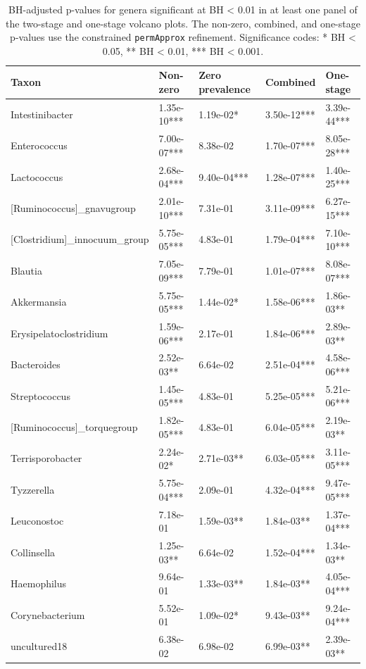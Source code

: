 \begin{table}[!h]
\centering
\caption{\label{tab:application:diff-distribution-pvalues-all-approaches}BH-adjusted p-values for genera significant at BH < 0.01 in at least one panel of the two-stage and one-stage volcano plots. The non-zero, combined, and one-stage p-values use the constrained \texttt{permApprox} refinement. Significance codes: * BH < 0.05, ** BH < 0.01, *** BH < 0.001.}
\centering
\fontsize{7}{9}\selectfont
\begin{tabular}[t]{lllll}
\toprule
Taxon & Non-zero & Zero prevalence & Combined & One-stage\\
\midrule
Intestinibacter & 1.35e-10*** & 1.19e-02* & 3.50e-12*** & 3.39e-44***\\
Enterococcus & 7.00e-07*** & 8.38e-02 & 1.70e-07*** & 8.05e-28***\\
Lactococcus & 2.68e-04*** & 9.40e-04*** & 1.28e-07*** & 1.40e-25***\\
{}[Ruminococcus]_gnavugroup & 2.01e-10*** & 7.31e-01 & 3.11e-09*** & 6.27e-15***\\
{}[Clostridium]_innocuum_group & 5.75e-05*** & 4.83e-01 & 1.79e-04*** & 7.10e-10***\\
\addlinespace
Blautia & 7.05e-09*** & 7.79e-01 & 1.01e-07*** & 8.08e-07***\\
Akkermansia & 5.75e-05*** & 1.44e-02* & 1.58e-06*** & 1.86e-03**\\
Erysipelatoclostridium & 1.59e-06*** & 2.17e-01 & 1.84e-06*** & 2.89e-03**\\
Bacteroides & 2.52e-03** & 6.64e-02 & 2.51e-04*** & 4.58e-06***\\
Streptococcus & 1.45e-05*** & 4.83e-01 & 5.25e-05*** & 5.21e-06***\\
\addlinespace
{}[Ruminococcus]_torquegroup & 1.82e-05*** & 4.83e-01 & 6.04e-05*** & 2.19e-03**\\
Terrisporobacter & 2.24e-02* & 2.71e-03** & 6.03e-05*** & 3.11e-05***\\
Tyzzerella & 5.75e-04*** & 2.09e-01 & 4.32e-04*** & 9.47e-05***\\
Leuconostoc & 7.18e-01 & 1.59e-03** & 1.84e-03** & 1.37e-04***\\
Collinsella & 1.25e-03** & 6.64e-02 & 1.52e-04*** & 1.34e-03**\\
\addlinespace
Haemophilus & 9.64e-01 & 1.33e-03** & 1.84e-03** & 4.05e-04***\\
Corynebacterium & 5.52e-01 & 1.09e-02* & 9.43e-03** & 9.24e-04***\\
uncultured18 & 6.38e-02 & 6.98e-02 & 6.99e-03** & 2.39e-03**\\

\end{tabular}
\end{table}
